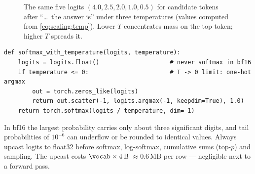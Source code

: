 \begin{figure}[t]
\centering
{}
\caption{The same five logits $(4.0, 2.5, 2.0, 1.0, 0.5)$ for candidate tokens after
``\dots\ the answer is'' under three temperatures (values computed from \cref{eq:scaling:temp}).
Lower $T$ concentrates mass on the top token; higher $T$ spreads it.}
\label{fig:scaling:tempbars}
\end{figure}

\begin{lstlisting}[caption={Temperature-scaled softmax (Lab 22, Task 1).},label={lst:scaling:temp}]
def softmax_with_temperature(logits, temperature):
    logits = logits.float()                    # never softmax in bf16
    if temperature <= 0:                       # T -> 0 limit: one-hot argmax
        out = torch.zeros_like(logits)
        return out.scatter(-1, logits.argmax(-1, keepdim=True), 1.0)
    return torch.softmax(logits / temperature, dim=-1)
\end{lstlisting}

\begin{pitfall}
In bf16 the largest probability carries only about three significant digits, and tail probabilities
of $10^{-6}$ can underflow or be rounded to identical values. Always upcast logits to float32
before softmax, log-softmax, cumulative sums (top-$p$) and sampling. The upcast costs
$\vocab \times 4$\,B $\approx 0.6$\,MB per row --- negligible next to a forward pass.
\end{pitfall}

